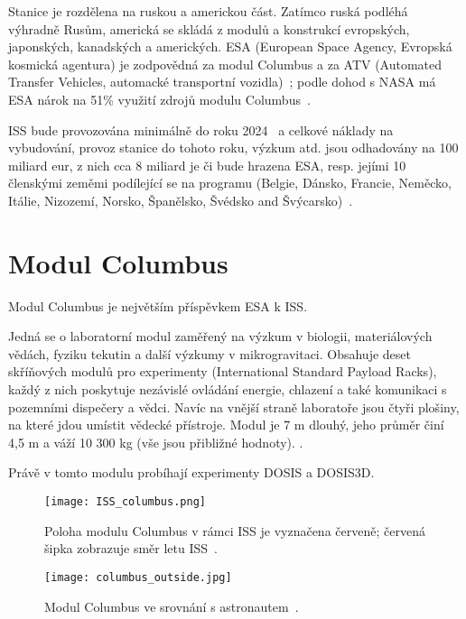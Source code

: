 Stanice je rozdělena na ruskou a americkou část. Zatímco ruská podléhá výhradně Rusům, americká se skládá z modulů a konstrukcí evropských, japonských, kanadských a amerických. ESA (European Space Agency, Evropská kosmická agentura) je zodpovědná za modul Columbus a za ATV (Automated Transfer Vehicles, automacké transportní vozidla)~\cite{ISS_about}; podle dohod s NASA má ESA nárok na 51\% využití zdrojů modulu Columbus~\cite{ISS_wiki}.

ISS bude provozována minimálně do roku 2024~\cite{ISS_prodlouzeni} a celkové náklady na vybudování, provoz stanice do tohoto roku, výzkum atd. jsou odhadovány na 100 miliard eur, z nich cca 8 miliard je či bude hrazena ESA, resp. jejími 10 členskými zeměmi podílející se na programu (Belgie, Dánsko, Francie, Neměcko, Itálie, Nizozemí, Norsko, Španělsko, Švédsko and Švýcarsko)~\cite{ISS_cost}.
\section{Modul Columbus}\label{sec:ISS_columbus}
Modul Columbus je největším příspěvkem ESA k ISS.

Jedná se o laboratorní modul zaměřený na výzkum v biologii, materiálových vědách, fyziku tekutin a další výzkumy v mikrogravitaci. Obsahuje deset skříňových modulů pro experimenty (International Standard Payload Racks), každý z nich poskytuje nezávislé ovládání energie, chlazení a také komunikaci s pozemními dispečery a vědci. Navíc na vnější straně laboratoře jsou čtyři plošiny, na které jdou umístit vědecké přístroje. Modul je 7 m dlouhý, jeho průměr činí 4,5 m a váží 10 300 kg (vše jsou přibližné hodnoty). \cite{columbus}.

Právě v tomto modulu probíhají experimenty DOSIS a DOSIS3D. 
\begin{figure}[H]
  \centering
  \texttt{[image: ISS\_columbus.png]}
  \caption{Poloha modulu Columbus v rámci ISS je vyznačena červeně; červená šipka zobrazuje směr letu ISS~\cite{dosis}.}
  \label{fig:columbus_poloha}
\end{figure}
\begin{figure}[H]
  \centering
  \texttt{[image: columbus\_outside.jpg]}
  \caption{Modul Columbus ve srovnání s astronautem~\cite{columbus_outside}.}
  \label{fig:columbus_srovnani}
\end{figure}

